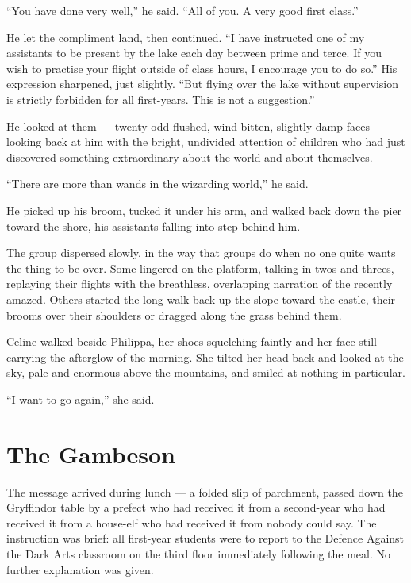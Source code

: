\enquote{You have done very well,} he said. \enquote{All of you. A very good first class.}
 
He let the compliment land, then continued. \enquote{I have instructed one of my assistants to be present by the lake each day between prime and terce. If you wish to practise your flight outside of class hours, I encourage you to do so.} His expression sharpened, just slightly. \enquote{But flying over the lake without supervision is strictly forbidden for all first-years. This is not a suggestion.}
 
He looked at them --- twenty-odd flushed, wind-bitten, slightly damp faces looking back at him with the bright, undivided attention of children who had just discovered something extraordinary about the world and about themselves.
 
\enquote{There are more than wands in the wizarding world,} he said.
 
He picked up his broom, tucked it under his arm, and walked back down the pier toward the shore, his assistants falling into step behind him.
 
The group dispersed slowly, in the way that groups do when no one quite wants the thing to be over. Some lingered on the platform, talking in twos and threes, replaying their flights with the breathless, overlapping narration of the recently amazed. Others started the long walk back up the slope toward the castle, their brooms over their shoulders or dragged along the grass behind them.
 
Celine walked beside Philippa, her shoes squelching faintly and her face still carrying the afterglow of the morning. She tilted her head back and looked at the sky, pale and enormous above the mountains, and smiled at nothing in particular.
 
\enquote{I want to go again,} she said.

\section*{The Gambeson}
 
The message arrived during lunch --- a folded slip of parchment, passed down the Gryffindor table by a prefect who had received it from a second-year who had received it from a house-elf who had received it from nobody could say. The instruction was brief: all first-year students were to report to the Defence Against the Dark Arts classroom on the third floor immediately following the meal. No further explanation was given.
 
